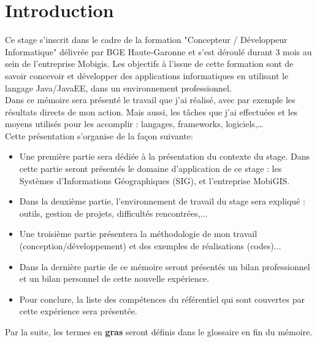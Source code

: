 \chapter{Introduction} 
\label{Introduction}

Ce stage s'inscrit dans le cadre de la formation "Concepteur / Développeur Informatique" délivrée par BGE Haute-Garonne et s'est déroulé durant 3 mois au sein de l'entreprise Mobigis. Les objectifs à l'issue de cette formation sont de savoir concevoir et développer des applications informatiques en utilisant le langage Java/JavaEE, dans un environnement professionnel.\\

Dans ce mémoire sera présenté le travail que j'ai réalisé, avec par exemple les résultats directs de mon action. Mais aussi, les tâches que j'ai effectuées et les moyens utilisés pour les accomplir : langages, frameworks, logiciels,…\\
 
Cette présentation s'organise de la façon suivante:\newline

\begin{itemize}
\item Une première partie sera dédiée à la présentation du contexte du stage. Dans cette partie seront présentés le domaine d'application de ce stage : les Systèmes d'Informations Géographiques (SIG), et l'entreprise MobiGIS.\\

\item Dans la deuxième partie, l'environnement de travail du stage sera expliqué : outils, gestion de projets, difficultés rencontrées,...\\

\item Une troisième partie présentera la méthodologie de mon travail (conception/développement) et des exemples de réalisations (codes)...\\

\item Dans la dernière partie de ce mémoire seront présentés un bilan professionnel et un bilan personnel de cette nouvelle expérience. \\

\item Pour conclure, la liste des compétences du référentiel qui sont couvertes par cette expérience sera présentée.\newline

\end{itemize}

Par la suite, les termes en \textbf{gras} seront définis dans le glossaire en fin du mémoire.

